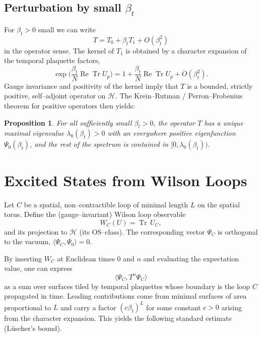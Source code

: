 \documentclass[11pt]{article}
\newtheorem{proposition}[theorem]{Proposition}
\begin{document}
\subsection{Perturbation by small $\beta_t$}

For $\beta_t>0$ small we can write
\begin{equation}
  T = T_0 + \beta_t T_1 + O(\beta_t^2)
\end{equation}
in the operator sense. The kernel of $T_1$ is obtained by a character
expansion of the temporal plaquette factors,
\begin{equation}
  \exp\Big(\frac{\beta_t}{N}\operatorname{Re}\operatorname{Tr} U_p\Big)
  = 1 + \frac{\beta_t}{N}\operatorname{Re}\operatorname{Tr} U_p
    + O(\beta_t^2).
\end{equation}
Gauge invariance and positivity of the kernel imply that $T$ is a
bounded, strictly positive, self--adjoint operator on $\mathcal{H}$.
The Krein--Rutman / Perron--Frobenius theorem for positive operators
then yields:

\begin{proposition}
For all sufficiently small $\beta_t>0$, the operator $T$ has a unique
maximal eigenvalue $\lambda_0(\beta_t)>0$ with an everywhere positive
eigenfunction $\Psi_0(\beta_t)$, and the rest of the spectrum is contained
in $[0,\lambda_0(\beta_t))$.
\end{proposition}

\section{Excited States from Wilson Loops}

Let $C$ be a spatial, non--contractible loop of minimal length $L$ on the
spatial torus. Define the (gauge--invariant) Wilson loop observable
\begin{equation}
  W_C(U) = \operatorname{Tr}\,U_C,
\end{equation}
and its projection to $\mathcal{H}$ (its OS--class). The corresponding
vector $\Psi_C$ is orthogonal to the vacuum,
$\langle \Psi_C,\Psi_0\rangle = 0$.

By inserting $W_C$ at Euclidean times $0$ and $n$ and evaluating the
expectation value, one can express
\begin{equation}
  \langle \Psi_C, T^n \Psi_C\rangle
\end{equation}
as a sum over surfaces tiled by temporal plaquettes whose boundary is the
loop $C$ propagated in time. Leading contributions come from minimal
surfaces of area proportional to $L$ and carry a factor
$(c\beta_t)^L$ for some constant $c>0$ arising from the character
expansion. This yields the following standard estimate (L\"uscher's bound).
\end{document}

